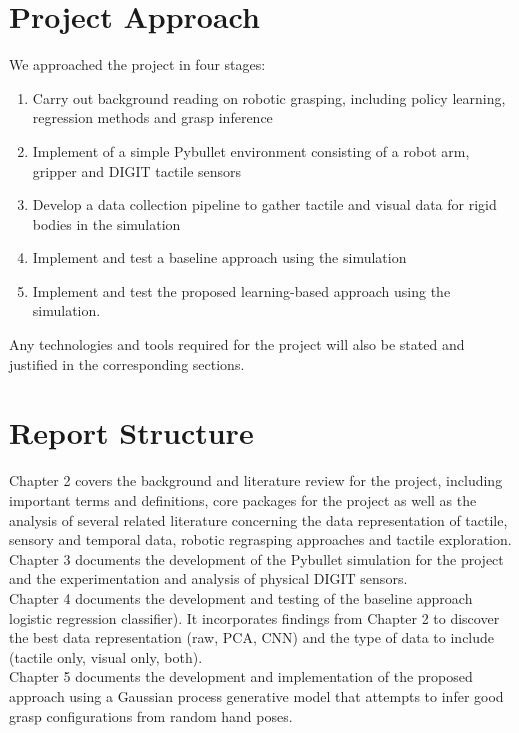 \documentclass[11pt, a4paper]{report}
\theoremstyle{definition}
\begin{document}
\newpage
\section{Project Approach}
\label{sec:1.3}
We approached the project in four stages:
\begin{enumerate}
    \item Carry out background reading on robotic grasping, including policy learning, regression methods and grasp inference
    \item Implement of a simple Pybullet environment consisting of a robot arm, gripper and DIGIT tactile sensors
    \item Develop a data collection pipeline to gather tactile and visual data for rigid bodies in the simulation
    \item Implement and test a baseline approach using the simulation
    \item Implement and test the proposed learning-based approach using the simulation.
\end{enumerate}
Any technologies and tools required for the project will also be stated and justified in the corresponding sections.


\section{Report Structure}
\label{sec:1.4}
Chapter 2 covers the background and literature review for the project, including important terms and definitions, core packages for the project as well as the analysis of several related literature concerning the data representation of tactile, sensory and temporal data, robotic regrasping approaches and tactile exploration.\\

Chapter 3 documents the development of the Pybullet simulation for the project and the experimentation and analysis of physical DIGIT sensors.\\

Chapter 4 documents the development and testing of the baseline approach logistic regression classifier). It incorporates findings from Chapter 2 to discover the best data representation (raw, PCA, CNN) and the type of data to include (tactile only, visual only, both).\\

Chapter 5 documents the development and implementation of the proposed approach using a Gaussian process generative model that attempts to infer good grasp configurations from random hand poses.\\
\end{document}
